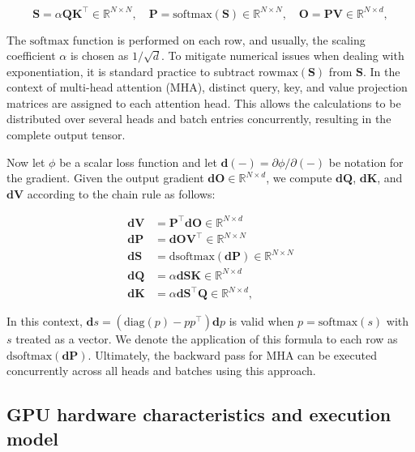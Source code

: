 \begin{equation*}
  \mathbf{S} = \alpha \mathbf{Q} \mathbf{K}^\top \in \mathbb{R}^{N \times N}, \quad \mathbf{P} = \mathrm{softmax}(\mathbf{S}) \in \mathbb{R}^{N \times N}, \quad \mathbf{O} = \mathbf{P}\mathbf{V} \in \mathbb{R}^{N \times d},
\end{equation*}

The $\mathrm{softmax}$ function is performed on each row, and usually, the scaling coefficient $\alpha$ is chosen as $1/\sqrt{d}$. To mitigate numerical issues when dealing with exponentiation, it is standard practice to subtract $\mathrm{rowmax}(\mathbf{S})$ from $\mathbf{S}$. In the context of multi-head attention (MHA), distinct query, key, and value projection matrices are assigned to each attention head. This allows the calculations to be distributed over several heads and batch entries concurrently, resulting in the complete output tensor.

Now let $\phi$ be a scalar loss function and let $\mathbf{d}(-) = \partial \phi / \partial (-)$ be notation for the gradient. Given the output gradient $\mathbf{dO} \in \mathbb{R}^{N \times d}$, we compute $\mathbf{dQ}$, $\mathbf{dK}$, and $\mathbf{dV}$ according to the chain rule as follows:

\begin{align*}
  \mathbf{dV} &= \mathbf{P}^\top \mathbf{dO} \in \mathbb{R}^{N \times d} \\
  \mathbf{dP} &= \mathbf{dO} \mathbf{V}^\top \in \mathbb{R}^{N \times N} \\
  \mathbf{dS} &= \mathrm{dsoftmax} (\mathbf{dP}) \in \mathbb{R}^{N \times N} \\
  \mathbf{dQ} &= \alpha \mathbf{dS} \mathbf{K} \in \mathbb{R}^{N \times d} \\
  \mathbf{dK} &= \alpha \mathbf{dS}^\top \mathbf{Q} \in \mathbb{R}^{N \times d},
\end{align*}

In this context, $\mathbf{d}s = (\mathrm{diag}(p) - p p^\top)\mathbf{d}p$ is valid when $p = \mathrm{softmax}(s)$ with $s$ treated as a vector. We denote the application of this formula to each row as $\mathrm{dsoftmax}(\mathbf{dP})$. Ultimately, the backward pass for MHA can be executed concurrently across all heads and batches using this approach.

\subsection{GPU hardware characteristics and execution model}
\label{subsec:hardware}

